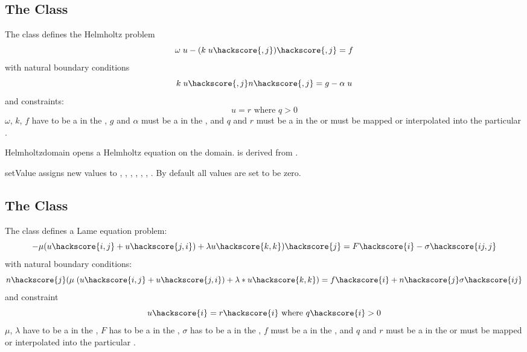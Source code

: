 \subsection{The \Helmholtz Class}
The \Helmholtz class defines the Helmholtz problem
\begin{equation}\label{HZ.1}
\omega \; u - (k\; u\hackscore{,j})\hackscore{,j} = f
\end{equation}
 with natural boundary conditions
\begin{equation}\label{HZ.2}
k\; u\hackscore{,j} n\hackscore{,j} = g- \alpha \; u 
\end{equation}
and constraints:
\begin{equation}\label{HZ.3}
u=r \mbox{ where } q>0
\end{equation}
$\omega$, $k$, $f$ have to be a \Scalar in the \Function,
$g$ and $\alpha$ must be a \Scalar in  the \FunctionOnBoundary,
and $q$ and $r$ must be a \Scalar in  the \SolutionFS or must be mapped or interpolated into the particular \FunctionSpace.

\begin{classdesc}{Helmholtz}{domain}
opens a Helmholtz equation on the \Domain domain. \Helmholtz is derived from \LinearPDE.
\end{classdesc}
\begin{methoddesc}[Helmholtz]{setValue}{       }
assigns new values to , , , , , , . By default all values are set to be zero.
\end{methoddesc}

\subsection{The \Lame Class}
The \Lame class defines a Lame equation problem:
\begin{equation}\label{LE.1}
-\mu (u\hackscore{i,j}+u\hackscore{j,i})+\lambda u\hackscore{k,k})\hackscore{j} = F\hackscore{i}-\sigma\hackscore{ij,j}
\end{equation}
with natural boundary conditions:
\begin{equation}\label{LE.2}
n\hackscore{j}(\mu \; (u\hackscore{i,j}+u\hackscore{j,i})+\lambda*u\hackscore{k,k}) = f\hackscore{i}+n\hackscore{j}\sigma\hackscore{ij}
\end{equation}
and constraint
\begin{equation}\label{LE.3}
u\hackscore{i}=r\hackscore{i} \mbox{ where } q\hackscore{i}>0
\end{equation}
$\mu$, $\lambda$ have to be a \Scalar in the \Function,
$F$ has to be a \Vector in the \Function,
$\sigma$ has to be a \Tensor in the \Function,
$f$ must be a \Vector in  the \FunctionOnBoundary,
and $q$ and $r$ must be a \Vector in  the \SolutionFS or must be mapped or interpolated into the particular \FunctionSpace.

